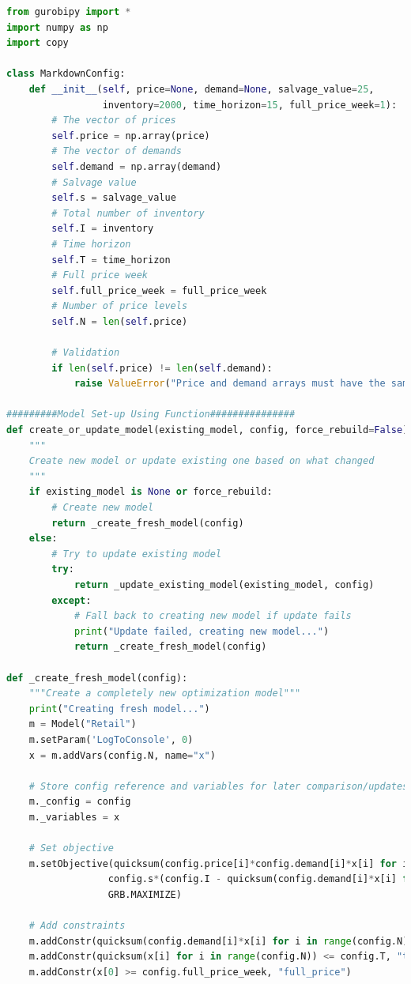 \documentclass[12pt]{article}
\begin{document}
\begin{lstlisting}[language=Python, caption={Markdown Management Python Code}]
from gurobipy import *
import numpy as np
import copy

class MarkdownConfig:
    def __init__(self, price=None, demand=None, salvage_value=25, 
                 inventory=2000, time_horizon=15, full_price_week=1):
        # The vector of prices
        self.price = np.array(price)
        # The vector of demands
        self.demand = np.array(demand)
        # Salvage value
        self.s = salvage_value
        # Total number of inventory
        self.I = inventory
        # Time horizon
        self.T = time_horizon
        # Full price week
        self.full_price_week = full_price_week
        # Number of price levels
        self.N = len(self.price)
        
        # Validation
        if len(self.price) != len(self.demand):
            raise ValueError("Price and demand arrays must have the same length")
    
#########Model Set-up Using Function###############
def create_or_update_model(existing_model, config, force_rebuild=False):
    """
    Create new model or update existing one based on what changed
    """
    if existing_model is None or force_rebuild:
        # Create new model
        return _create_fresh_model(config)
    else:
        # Try to update existing model
        try:
            return _update_existing_model(existing_model, config)
        except:
            # Fall back to creating new model if update fails
            print("Update failed, creating new model...")
            return _create_fresh_model(config)

def _create_fresh_model(config):
    """Create a completely new optimization model"""
    print("Creating fresh model...")
    m = Model("Retail")
    m.setParam('LogToConsole', 0)
    x = m.addVars(config.N, name="x")
    
    # Store config reference and variables for later comparison/updates
    m._config = config
    m._variables = x
    
    # Set objective
    m.setObjective(quicksum(config.price[i]*config.demand[i]*x[i] for i in range(config.N)) + 
                  config.s*(config.I - quicksum(config.demand[i]*x[i] for i in range(config.N))), 
                  GRB.MAXIMIZE)
    
    # Add constraints
    m.addConstr(quicksum(config.demand[i]*x[i] for i in range(config.N)) <= config.I, "inventory")
    m.addConstr(quicksum(x[i] for i in range(config.N)) <= config.T, "time")
    m.addConstr(x[0] >= config.full_price_week, "full_price")
    

\end{lstlisting}
\end{document}

